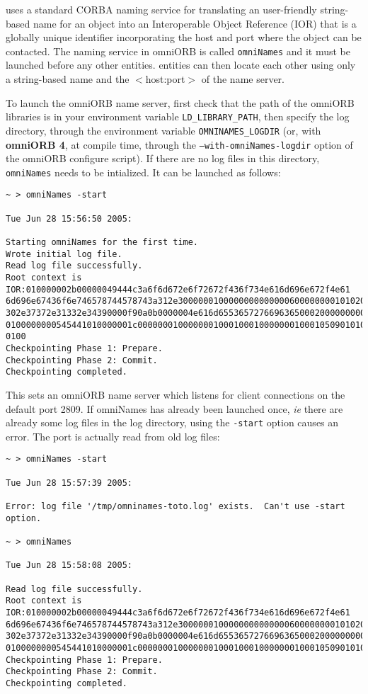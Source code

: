 \diet uses a standard CORBA naming service for translating an user-friendly
string-based name for an object into an Interoperable Object Reference (IOR)
that is a globally unique identifier incorporating the host and port where the
object can be contacted.  The naming service in omniORB is called
\texttt{omniNames} and it must be launched before any other \diet entities.
\diet entities can then locate each other using only a string-based name and
the $<$host:port$>$ of the name server.

To launch the omniORB name server, first check that the path of the omniORB
libraries is in your environment variable \texttt{LD\_LIBRARY\_PATH}, then
specify the log directory, through the environment variable
\texttt{OMNINAMES\_LOGDIR} (or, with \textbf{omniORB 4}, at compile time,
through the \texttt{--with-omniNames-logdir} option of the omniORB configure
script). If there are no log files in this directory, \texttt{omniNames} needs
to be intialized. It can be launched as follows:  {\footnotesize
\begin{verbatim}
~ > omniNames -start

Tue Jun 28 15:56:50 2005:

Starting omniNames for the first time.
Wrote initial log file.
Read log file successfully.
Root context is IOR:010000002b00000049444c3a6f6d672e6f72672f436f734e616d696e672f4e61
6d696e67436f6e746578744578743a312e300000010000000000000060000000010102000d0000003134
302e37372e31332e34390000f90a0b0000004e616d655365727669636500020000000000000008000000
0100000000545441010000001c0000000100000001000100010000000100010509010100010000000901
0100
Checkpointing Phase 1: Prepare.
Checkpointing Phase 2: Commit.
Checkpointing completed.
\end{verbatim}
}

This sets an omniORB name server which listens for client connections on the
default port 2809. If omniNames has already been launched once, \emph{ie} there
are already some log files in the log directory, using the \texttt{-start}
option causes an error. The port is actually read from old log files:
{\footnotesize
\begin{verbatim}
~ > omniNames -start

Tue Jun 28 15:57:39 2005:

Error: log file '/tmp/omninames-toto.log' exists.  Can't use -start option.

~ > omniNames  

Tue Jun 28 15:58:08 2005:

Read log file successfully.
Root context is IOR:010000002b00000049444c3a6f6d672e6f72672f436f734e616d696e672f4e61
6d696e67436f6e746578744578743a312e300000010000000000000060000000010102000d0000003134
302e37372e31332e34390000f90a0b0000004e616d655365727669636500020000000000000008000000
0100000000545441010000001c0000000100000001000100010000000100010509010100010000000901
Checkpointing Phase 1: Prepare.
Checkpointing Phase 2: Commit.
Checkpointing completed.
\end{verbatim}
}


